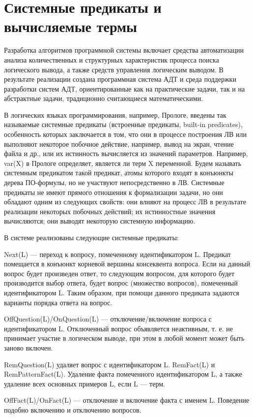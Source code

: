 \section{Системные предикаты и вычисляемые термы}
Разработка алгоритмов программной системы включает средства автоматизации анализа количественных и структурных характеристик процесса поиска логического вывода, а также средств управления логическим выводом. В результате реализации создана программная система АДТ и среда поддержки разработки систем АДТ, ориентированные как на практические задачи, так и на абстрактные задачи, традиционно считающиеся математическими.

В логических языках программирования, например, Прологе, введены так называемые системные предикаты (встроенные предикаты, built-in predicates), особенность которых заключается в том, что они в процессе построения ЛВ или выполняют некоторое побочное действие, например, вывод на экран, чтение файла и др., или их истинность вычисляется из значений параметров. Например, var(X) в Прологе определяет, является ли терм X переменной. Будем называть системным предикатом такой предикат, атомы которого входят в конъюнкты дерева ПО-формулы, но не участвуют непосредственно в ЛВ. Системные предикаты не имеют прямого отношения к формализации задачи, но они обладают одним из следующих свойств: они влияют на процесс ЛВ в результате реализации некоторых побочных действий; их истинностные значения вычисляются; они выводят некоторую системную информацию.

В системе реализованы следующие системные предикаты:

Next(L) — переход к вопросу, помеченному идентификатором L. Предикат помещается в конъюнкт корневой вершины консеквента вопроса. Если на данный вопрос будет произведен ответ, то следующим вопросом, для которого будет производится выбор ответа, будет вопрос (множество вопросов), помеченный идентификатором L. Таким образом, при помощи данного предиката задаются варианты порядка ответа на вопрос.

OffQuestion(L)/OnQuestion(L) — отключение/включение вопроса с идентификатором L. Отключенный вопрос объявляется неактивным, т. е. не принимает участие в логическом выводе, при этом в любой момент может быть заново включен.

RemQuestion(L) удаляет вопрос с идентификатором L. RemFact(L) и RemPatternFact(L). Удаление факта помеченного идентификатором L, а также удаление  всех основных примеров L, если L –– терм.

OffFact(L)/OnFact(L) — отключение и включение факта с именем L. Поведение подобно включению и отключению вопросов.

